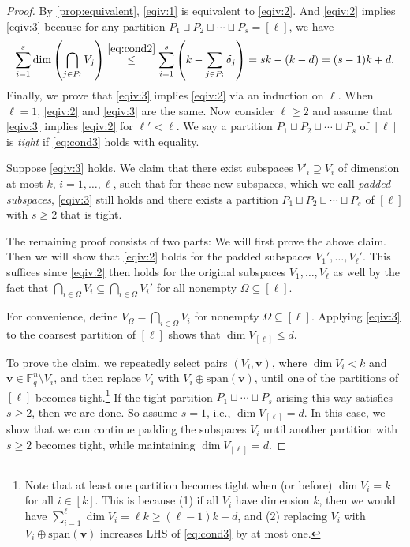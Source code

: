 \documentclass[11pt]{article}
\theoremstyle{plain}
\theoremstyle{definition}
\theoremstyle{remark}
\newcommand{\bv}{\bm{v}}
\begin{document}
\begin{proof}
By \cref{prop:equivalent}, \cref{eqiv:1} is equivalent to \cref{eqiv:2}. 
And \cref{eqiv:2} implies \cref{eqiv:3} because for any partition $P_1\sqcup P_2\sqcup\cdots\sqcup P_s=[\ell]$, we have 
\[
\sum_{i=1}^s \dim\left(\bigcap_{j\in P_i} V_j\right)\stackrel{\eqref{eq:cond2}}{\leq} \sum_{i=1}^s \left(k-\sum_{j\in P_i}\delta_j\right)=sk-(k-d)=(s-1)k+d.
\]
Finally, we prove that \cref{eqiv:3} implies \cref{eqiv:2} via an induction on $\ell$. 
When $\ell=1$, \cref{eqiv:2} and \cref{eqiv:3} are the same.
Now consider $\ell\geq 2$ and assume that \cref{eqiv:3} implies \cref{eqiv:2} for $\ell'<\ell$.
We say a partition $P_1\sqcup P_2\sqcup\cdots\sqcup P_s$ of $[\ell]$ is \emph{tight} if \eqref{eq:cond3} holds with equality.

Suppose \cref{eqiv:3} holds. We claim that there exist subspaces $V'_i\supseteq V_i$ of dimension at most $k$,
$i=1,\dots,\ell$, such that for these new subspaces, which we call \emph{padded subspaces}, \cref{eqiv:3} still holds and there exists a partition $P_1\sqcup P_2\sqcup\cdots\sqcup P_s$ of $[\ell]$ with $s\geq 2$ that is tight.

The remaining proof consists of two parts: We will first prove the above claim. Then we will show that \cref{eqiv:2} holds for the padded subspaces $V_1',\dots,V_\ell'$.
This suffices since \cref{eqiv:2} then holds for the original subspaces $V_1,\dots,V_\ell$ as well by the fact that $\bigcap_{i\in \Omega}V_i \subseteq  \bigcap_{i\in \Omega}V_i'$ for all nonempty $\Omega\subseteq [\ell]$.

For convenience, define $V_\Omega=\bigcap_{i\in\Omega} V_i$ for nonempty $\Omega\subseteq [\ell]$.
Applying \cref{eqiv:3} to the coarsest partition of $[\ell]$ shows that $\dim V_{[\ell]}\leq d$.

To prove the claim, we repeatedly select pairs $(V_i, \bv)$, where $\dim V_i < k$ and $\bv \in \mathbb{F}_q^n \setminus V_i$, and then replace $V_i$ with $V_i \oplus \mathrm{span}(\bv)$, until one of the partitions of $[\ell]$ becomes tight.\footnote{Note that at least one partition becomes tight when (or before) $\dim V_i=k$ for all $i\in [k]$. This is because (1) if all $V_i$ have dimension $k$, then we would have $\sum_{i=1}^\ell \dim V_i=\ell k\geq (\ell-1)k+d$, and (2) replacing $V_i$ with $V_i \oplus \mathrm{span}(\bv)$ increases LHS of \eqref{eq:cond3} by at most one.}
If the tight partition $P_1\sqcup \cdots\sqcup P_s$ arising this way satisfies $s\geq 2$, then we are done. So assume $s=1$, i.e., $\dim V_{[\ell]}=d$. In this case, we show that we can continue padding the subspaces $V_i$ until another partition with $s\ge2$ becomes tight, while maintaining $\dim V_{[\ell]} = d$.


\end{proof}
\end{document}
